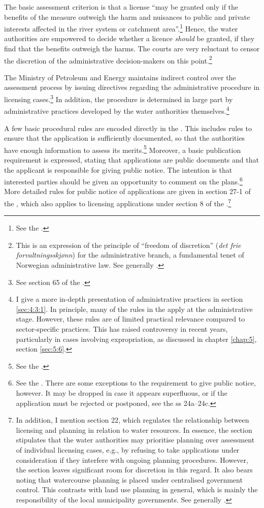 The basic assessment criterion is that a license ``may be granted only if the benefits of the measure outweigh the harm and nuisances to public and private interests affected in the river system or catchment area''.\footnote{See the \dni\cite[25]{wra00}.} Hence, the water authorities are empowered to decide whether a licence {\it should} be granted, if they find that the benefits outweigh the harms. The courts are very reluctant to censor the discretion of the administrative decision-makers on this point.\footnote{This is an expression of the principle of ``freedom of discretion'' ({\it det frie forvaltningsskjønn}) for the administrative branch, a fundamental tenet of Norwegian administrative law. See generally \cite[71-74]{eckhoff14}.}

The Ministry of Petroleum and Energy maintains indirect control over the assessment process by issuing directives regarding the administrative procedure in licensing cases.\footnote{See section 65 of the \cite{wra00}.} In addition, the procedure is determined in large part by administrative practices developed by the water authorities themselves.\footnote{I give a more in-depth presentation of administrative practices in section \ref{sec:4:3:1}. In principle, many of the rules in the \cite{paa67} apply at the administrative stage. However, these rules are of limited practical relevance compared to sector-specific practices. This has raised controversy in recent years, particularly in cases involving expropriation, as discussed in chapter \ref{chap:5}, section \ref{sec:5:6}.} 

A few basic procedural rules are encoded directly in the \cite{wra00}. This includes rules to ensure that the application is sufficiently documented, so that the authorities have enough information to assess its merits.\footnote{See the \dni\cite[23]{wra00}.} Moreover, a basic publication requirement is expressed, stating that applications are public documents and that the applicant is responsible for giving public notice. The intention is that interested parties should be given an opportunity to comment on the plans.\footnote{See the \dni\cite[24]{wra00}. There are some exceptions to the requirement to give public notice, however. It may be dropped in case it appears superfluous, or if the application must be rejected or postponed, see the \dni\cite{wra00} ss 24a--24c.} More detailed rules for public notice of applications are given in section 27-1 of the \cite{pb08}, which also applies to licensing applications under section 8 of the \cite{wra00}.\footnote{In addition, I mention section 22, which regulates the relationship between licensing and planning in relation to water resources. In essence, the section stipulates that the water authorities may prioritise planning over assessment of individual licensing cases, e.g., by refusing to take applications under consideration if they interfere with ongoing planning procedures. However, the section leaves significant room for discretion in this regard. It also bears noting that watercourse planning is placed under centralised government control. This contrasts with land use planning in general, which is mainly the responsibility of the local municipality governments. See generally \cite{sp}.}

